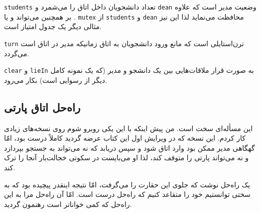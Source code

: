 \documentclass{book}
\newcommand{\clearemptydoublepage}{\newpage\cleardoublepage}
\begin{document}
    {\tt students}
    تعداد دانشجویان داخل اتاق را می‌شمرد و {\tt dean}  وضعیت مدیر است که علاوه بر  
    همچنین می‌تواند  و یا . 
    {\tt mutex}
    از  {\tt students} و {\tt dean} محافظت می‌نماید لذا این نیز مثالی دیگر یک جدول امتیاز است. 
    

    {\tt turn}
    ترن‌استایلی است که مانع ورود دانشجویان  به اتاق زمانیکه مدیر در اتاق است می‌گردد. 

    {\tt clear} و {\tt lieIn}
    به صورت قرار ملاقات‌هایی بین  یک دانشجو و مدیر (که یک نمونه کامل دیگر از رسوایی است)  بکار می‌رود. 


\clearemptydoublepage
\subsection{راه‌حل اتاق پارتی}

    این مسأله‌ای  سخت است. من پیش اینکه با این یکی روبرو شوم روی نسخه‌های زیادی کار کردم. این نسخه که در ویرایش اول این کتاب عرضه گردید 
    کاملاً درست بود، امّا گهگاهی مدیر ممکن بود وارد اتاق شود و سپس دریابد که نه می‌تواند به جستجو بپردازد و نه می‌تواند پارتی را متوقف کند، لذا او می‌بایست 
    در سکوتی خجالت‌بار آنجا را ترک کند. 

    یک راه‌حل نوشت که جلوی این حقارت را می‌گرفت، امّا نتیجه اینقدر پیچیده بود که به سختی توانستیم خود را متقاعد کنیم که راه‌حل درست است. 
    امّا آن راه‌حل مرا به این راه‌حل که کمی خواناتر است رهنمون گردید. 
\end{document}
